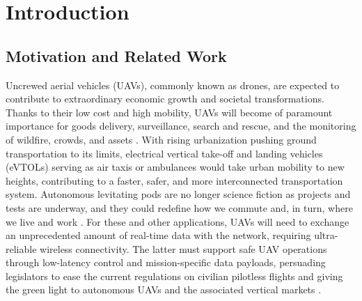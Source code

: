 \section{Introduction}\label{Introduction}


\subsection{Motivation and Related Work}

Uncrewed aerial vehicles (UAVs), commonly known as drones, are expected to contribute to extraordinary economic growth and societal transformations. Thanks to their low cost and high mobility, UAVs will become of paramount importance for goods delivery, surveillance, search and rescue, and the monitoring of wildfire, crowds, and assets \cite{GerGarAza2022,wu20205g,UAVfire2022}. With rising urbanization pushing ground transportation to its limits, electrical vertical take-off and landing vehicles (eVTOLs) serving as air taxis or ambulances would take urban mobility to new heights, contributing to a faster, safer, and more interconnected transportation system. Autonomous levitating pods are no longer science fiction as projects and tests are underway, and they could redefine how we commute and, in turn, where we live and work \cite{SaeAlnAlo2020}. 
For these and other applications, UAVs will need to exchange an unprecedented amount of real-time data with the network, requiring ultra-reliable wireless connectivity. The latter must support safe UAV operations through low-latency control and mission-specific data payloads, persuading legislators to ease the current regulations on civilian pilotless flights and giving the green light to autonomous UAVs and the associated vertical markets \cite{FotQiaDin2019,ZenGuvZha2020,SaaBenMoz2020,NamChaKim17,CDHJGC20}.

